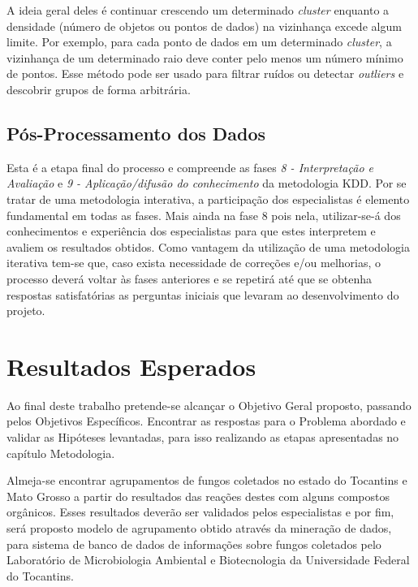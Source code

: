 \documentclass[tcc2]{classe_uftex/uftex}
\begin{document}
    A ideia geral deles é continuar crescendo um determinado \emph{cluster} enquanto a densidade (número de objetos ou pontos de dados) na vizinhança excede algum limite. Por exemplo, para cada ponto de dados em um determinado \emph{cluster}, a vizinhança de um determinado raio deve conter pelo menos um número mínimo de pontos. Esse método pode ser usado para filtrar ruídos ou detectar \emph{outliers} e descobrir grupos de forma arbitrária.

\section{Pós-Processamento dos Dados}
\label{sec:pos_processamento}
Esta é a etapa final do processo e compreende as fases \emph{8 - Interpretação e Avaliação} e \emph{9 - Aplicação/difusão do conhecimento} da metodologia KDD. Por se tratar de uma metodologia interativa, a participação dos especialistas é elemento fundamental em todas as fases. Mais ainda na fase 8 pois nela, utilizar-se-á dos conhecimentos e experiência dos especialistas para que estes interpretem e avaliem os resultados obtidos. Como vantagem da utilização de uma metodologia iterativa tem-se que, caso exista necessidade de correções e/ou melhorias, o processo deverá voltar às fases anteriores e se repetirá até que se obtenha respostas satisfatórias as perguntas iniciais que levaram ao desenvolvimento do projeto.

\chapter{Resultados Esperados}
\label{cap:resultados}
Ao final deste trabalho pretende-se alcançar o Objetivo Geral proposto, passando pelos Objetivos Específicos. Encontrar as respostas para o Problema abordado e validar as Hipóteses levantadas, para isso realizando as etapas apresentadas no capítulo Metodologia.

Almeja-se encontrar agrupamentos de fungos coletados no estado do Tocantins e Mato Grosso a partir do resultados das reações destes com alguns compostos orgânicos. Esses resultados deverão ser validados pelos especialistas e por fim, será proposto modelo de agrupamento obtido através da mineração de dados, para sistema de banco de dados de informações sobre fungos coletados pelo Laboratório de Microbiologia Ambiental e Biotecnologia da Universidade Federal do Tocantins.
\end{document}

